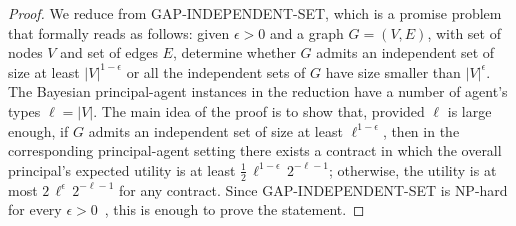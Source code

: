 \begin{proof}
	We reduce from GAP-INDEPENDENT-SET, which is a promise problem that formally reads as follows: given $\epsilon > 0$ and a graph $G= (V,E)$, with set of nodes $V$ and set of edges $E$, determine whether $G$ admits an independent set of size at least $|V|^{1-\epsilon}$ or all the independent sets of $G$ have size smaller than $|V|^{\epsilon}$.
	The Bayesian principal-agent instances in the reduction have a number of agent's types $\ell = |V|$.
	The main idea of the proof is to show that, provided $\ell$ is large enough, if $G$ admits an independent set of size at least $\ell^{1-\epsilon}$, then in the corresponding principal-agent setting there exists a contract in which the overall principal's expected utility is at least $\frac{1}{2} \, \ell^{1-\epsilon} \, 2^{-\ell-1}$; otherwise, the utility is at most $2 \, \ell^{\epsilon} \, 2^{-\ell-1}$ for any contract.
	Since GAP-INDEPENDENT-SET is \textnormal{\textsf{NP}}-hard for every $\epsilon>0$~\citep{hastad1999clique,Zuckerman2007linear}, this is enough to prove the statement.
	

\end{proof}

